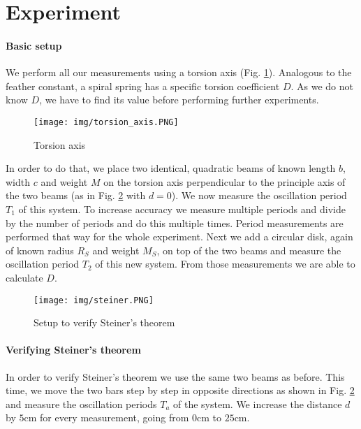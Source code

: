 \section{Experiment}

\paragraph{Basic setup}

We perform all our measurements using a torsion axis (Fig. \ref{fig::torsion}).
Analogous to the feather constant, a spiral spring has a specific torsion coefficient $D$.
As we do not know $D$, we have to find its value before performing further experiments.

\begin{figure} [ht]
	\centering
	\texttt{[image: img/torsion\_axis.PNG]}
	\caption{Torsion axis \cite{manual}}
	\label{fig::torsion}
\end{figure}

In order to do that, we place two identical, quadratic beams of known length $b$, width $c$ and weight $M$ on the torsion axis perpendicular to the principle axis of the two beams (as in Fig. \ref{fig::steiner} with $d = 0$).
We now measure the oscillation period $T_1$ of this system.
To increase accuracy we measure multiple periods and divide by the number of periods and do this multiple times.
Period measurements are performed that way for the whole experiment.
Next we add a circular disk, again of known radius $R_S$ and weight $M_S$, on top of the two beams and measure the oscillation period $T_2$ of this new system.
From those measurements we are able to calculate $D$.

\begin{figure} [ht]
	\centering
	\texttt{[image: img/steiner.PNG]}
	\caption{Setup to verify Steiner's theorem \cite{manual}}
	\label{fig::steiner}
\end{figure}

\paragraph{Verifying Steiner's theorem}
In order to verify Steiner's theorem we use the same two beams as before.
This time, we move the two bars step by step in opposite directions as shown in Fig. \ref{fig::steiner} and measure the oscillation periods $T_a$ of the system.
We increase the distance $d$ by $5$cm for every measurement, going from $0$cm to $25$cm.

